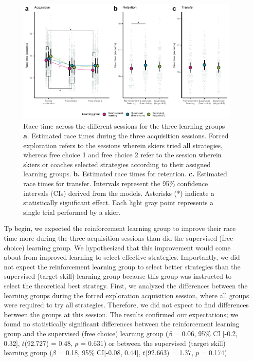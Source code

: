 \begin{figure}
    \centering
    \includegraphics[width=1\linewidth]{figure/figure_racingtimes_2.pdf}
    \caption{Race time across the different sessions for the three learning groups \textbf{a}. Estimated race times during the three acquisition sessions. Forced exploration refers to the sessions wherein skiers tried all strategies, whereas free choice 1 and free choice 2 refer to the session wherein skiers or coaches selected strategies according to their assigned learning groups. \textbf{b.} Estimated race times for retention. \textbf{c.} Estimated race times for transfer. Intervals represent the 95\% confidence intervals (CIs) derived from the models. Asterisks (*) indicate a statistically significant effect. Each light gray point represents a single trial performed by a skier.}
    \label{fig:rlstudy_racetime}
\end{figure}

Tp begin, we expected the reinforcement learning group to improve their race time more during the three acquisition sessions than did the supervised (free choice) learning group. We hypothesized that this improvement would come about from improved learning to select effective strategies. Importantly, we did not expect the reinforcement learning group to select better strategies than the supervised (target skill) learning group because this group was instructed to select the theoretical best strategy. First, we analyzed the differences between the learning groups during the forced exploration acquisition session, where all groups were required to try all strategies. Therefore, we did not expect to find differences between the groups at this session. The results confirmed our expectations; we found no statistically significant differences between the reinforcement learning group and the supervised (free choice) learning group ($\beta$ = 0.06, 95\% CI [-0.2, 0.32], $t$(92.727) = 0.48, $p$ = 0.631) or between the supervised (target skill) learning group  ($\beta$ = 0.18, 95\% CI[-0.08, 0.44], $t$(92.663) = 1.37, $p$ = 0.174).  


